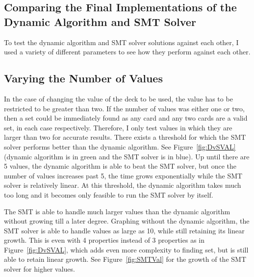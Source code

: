\documentclass[pageno]{jpaper}
\begin{document}
\subsection{Comparing the Final Implementations of the Dynamic Algorithm and SMT Solver}

To test the dynamic algorithm and SMT solver solutions against each other, I used a variety of different parameters to see how they perform against each other. 

\subsection{Varying the Number of Values}

In the case of changing the value of the deck to be used, the value has to be restricted to be greater than two. If the number of values was either one or two, then a set could be immediately found as any card and any two cards are a valid set, in each case respectively. Therefore, I only test values in which they are larger than two for accurate results. There exists a threshold for which the SMT solver performs better than the dynamic algorithm. See Figure~\ref{fig:DvSVAL} (dynamic algorithm is in green and the SMT solver is in blue). Up until there are 5 values, the dynamic algorithm is able to beat the SMT solver, but once the number of values increases past 5, the time grows exponentially while the SMT solver is relatively linear. At this threshold, the dynamic algorithm takes much too long and it becomes only feasible to run the SMT solver by itself. 

The SMT is able to handle much larger values than the dynamic algorithm without growing till a later degree. Graphing without the dynamic algorithm, the SMT solver is able to handle values as large as 10, while still retaining its linear growth. This is even with 4 properties instead of 3 properties as in Figure~\ref{fig:DvSVAL}, which adds even more complexity to finding set, but is still able to retain linear growth. See Figure~\ref{fig:SMTVal} for the growth of the SMT solver for higher values.
\end{document}
